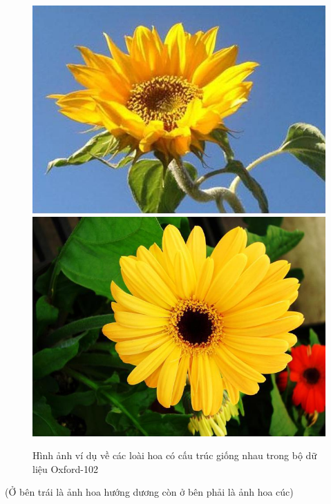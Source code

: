 \documentclass[12pt]{report}
\begin{document}
		\begin{figure}[h]
			\centering
			\includegraphics[scale=0.3]{anh_4}
			\includegraphics[scale=0.3]{anh_3}
			\caption{Hình ảnh ví dụ về các loài hoa có cấu trúc giống nhau trong bộ dữ liệu Oxford-102 }
			\label{fig:anh_hoa_cautruc_giongnhau}
		\end{figure}
		(Ở bên trái là ảnh hoa hướng dương còn ở bên phải là ảnh hoa cúc)
																																																																								
\end{document}

